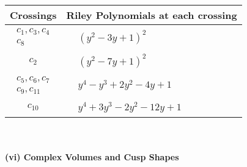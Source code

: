 \documentclass[1p]{elsarticle_modified}
\theoremstyle{definition}
\begin{document}
\begin{tabular}{m{50pt}|m{274pt}}
Crossings & \hspace{64pt}Riley Polynomials at each crossing \\
\hline $$\begin{aligned}c_{1},c_{3},c_{4}\\c_{8}\end{aligned}$$&$\begin{aligned}
&(y^2-3 y+1)^2
\end{aligned}$\\
\hline $$\begin{aligned}c_{2}\end{aligned}$$&$\begin{aligned}
&(y^2-7 y+1)^2
\end{aligned}$\\
\hline $$\begin{aligned}c_{5},c_{6},c_{7}\\c_{9},c_{11}\end{aligned}$$&$\begin{aligned}
&y^4- y^3+2 y^2-4 y+1
\end{aligned}$\\
\hline $$\begin{aligned}c_{10}\end{aligned}$$&$\begin{aligned}
&y^4+3 y^3-2 y^2-12 y+1
\end{aligned}$\\
\hline
\end{tabular}\\~\\
\newpage\flushleft \textbf{(vi) Complex Volumes and Cusp Shapes}
\end{document}
